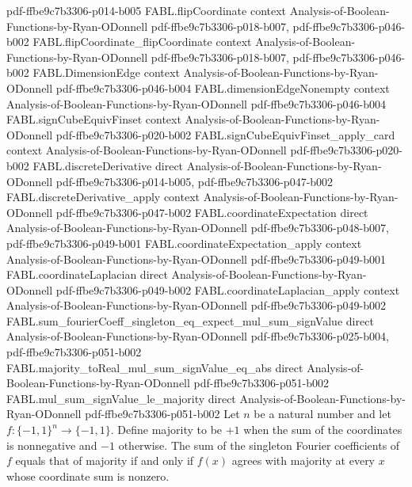 \begin{theorem}
  {pdf-ffbe9c7b3306-p014-b005}
\proofstep
  {FABL.flipCoordinate}
  {context}
  {Analysis-of-Boolean-Functions-by-Ryan-ODonnell}
  {pdf-ffbe9c7b3306-p018-b007,
    pdf-ffbe9c7b3306-p046-b002}
\proofstep
  {FABL.flipCoordinate_flipCoordinate}
  {context}
  {Analysis-of-Boolean-Functions-by-Ryan-ODonnell}
  {pdf-ffbe9c7b3306-p018-b007,
    pdf-ffbe9c7b3306-p046-b002}
\proofstep
  {FABL.DimensionEdge}
  {context}
  {Analysis-of-Boolean-Functions-by-Ryan-ODonnell}
  {pdf-ffbe9c7b3306-p046-b004}
\proofstep
  {FABL.dimensionEdgeNonempty}
  {context}
  {Analysis-of-Boolean-Functions-by-Ryan-ODonnell}
  {pdf-ffbe9c7b3306-p046-b004}
\proofstep
  {FABL.signCubeEquivFinset}
  {context}
  {Analysis-of-Boolean-Functions-by-Ryan-ODonnell}
  {pdf-ffbe9c7b3306-p020-b002}
\proofstep
  {FABL.signCubeEquivFinset_apply_card}
  {context}
  {Analysis-of-Boolean-Functions-by-Ryan-ODonnell}
  {pdf-ffbe9c7b3306-p020-b002}
\proofstep
  {FABL.discreteDerivative}
  {direct}
  {Analysis-of-Boolean-Functions-by-Ryan-ODonnell}
  {pdf-ffbe9c7b3306-p014-b005,
    pdf-ffbe9c7b3306-p047-b002}
\proofstep
  {FABL.discreteDerivative_apply}
  {context}
  {Analysis-of-Boolean-Functions-by-Ryan-ODonnell}
  {pdf-ffbe9c7b3306-p047-b002}
\proofstep
  {FABL.coordinateExpectation}
  {direct}
  {Analysis-of-Boolean-Functions-by-Ryan-ODonnell}
  {pdf-ffbe9c7b3306-p048-b007,
    pdf-ffbe9c7b3306-p049-b001}
\proofstep
  {FABL.coordinateExpectation_apply}
  {context}
  {Analysis-of-Boolean-Functions-by-Ryan-ODonnell}
  {pdf-ffbe9c7b3306-p049-b001}
\proofstep
  {FABL.coordinateLaplacian}
  {direct}
  {Analysis-of-Boolean-Functions-by-Ryan-ODonnell}
  {pdf-ffbe9c7b3306-p049-b002}
\proofstep
  {FABL.coordinateLaplacian_apply}
  {context}
  {Analysis-of-Boolean-Functions-by-Ryan-ODonnell}
  {pdf-ffbe9c7b3306-p049-b002}
\proofstep
  {FABL.sum_fourierCoeff_singleton_eq_expect_mul_sum_signValue}
  {direct}
  {Analysis-of-Boolean-Functions-by-Ryan-ODonnell}
  {pdf-ffbe9c7b3306-p025-b004,
    pdf-ffbe9c7b3306-p051-b002}
\proofstep
  {FABL.majority_toReal_mul_sum_signValue_eq_abs}
  {direct}
  {Analysis-of-Boolean-Functions-by-Ryan-ODonnell}
  {pdf-ffbe9c7b3306-p051-b002}
\proofstep
  {FABL.mul_sum_signValue_le_majority}
  {direct}
  {Analysis-of-Boolean-Functions-by-Ryan-ODonnell}
  {pdf-ffbe9c7b3306-p051-b002}
Let $n$ be a natural number and let $f:\{-1,1\}^n\to\{-1,1\}$. Define majority to be
$+1$ when the sum of the coordinates is nonnegative and $-1$ otherwise. The sum of the
singleton Fourier coefficients of $f$ equals that of majority if and only if $f(x)$
agrees with majority at every $x$ whose coordinate sum is nonzero.
\end{theorem}

